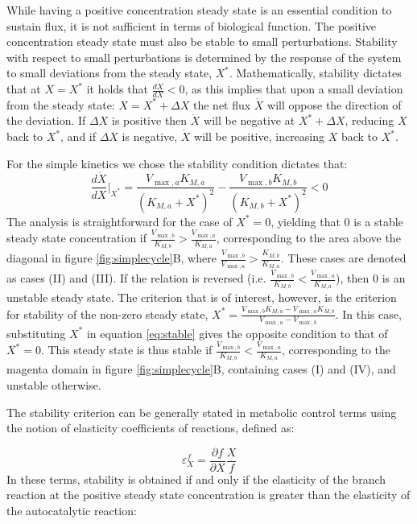     While having a positive concentration steady state is an essential condition to sustain flux, it is not sufficient in terms of biological function.
    The positive concentration steady state must also be stable to small perturbations.
    Stability with respect to small perturbations is determined by the response of the system to small deviations from the steady state, $X^*$.
    Mathematically, stability dictates that at $X=X^*$ it holds that $\frac{d\dot X}{dX} <0$, as this  implies that upon a small deviation from the steady state: $X = X^*+\Delta X$ the net flux $\dot X$ will oppose the direction of the deviation.
    If $\Delta X$ is positive then $\dot X$ will be negative at $X^*+\Delta X$, reducing $X$ back to $X^*$, and if $\Delta X$ is negative, $\dot X$ will be positive, increasing $X$ back to $X^*$.

    For the simple kinetics we chose the stability condition dictates that:
    \begin{equation}
        \label{eq:stable}
      \frac{d\dot X}{dX}\Big\vert_{X^*} = \frac{V_{\max,a}K_{M,a}}{(K_{M,a}+X^*)^2}-\frac{V_{\max,b}K_{M,b}}{(K_{M,b}+X^*)^2}<0
    \end{equation}
    The analysis is straightforward for the case of $X^*=0$, yielding that $0$ is a stable steady state concentration if $\frac{V_{\max,b}}{K_{M,b}}>\frac{V_{\max,a}}{K_{M,a}}$, corresponding to the area above the diagonal in figure \ref{fig:simplecycle}B, where $\frac{V_{\max,b}}{V_{\max,a}}>\frac{K_{M,b}}{K_{M,a}}$. These cases are denoted as cases (II) and (III).
    If the relation is reversed (i.e. $\frac{V_{\max,b}}{K_{M,b}}<\frac{V_{\max,a}}{K_{M,a}}$), then $0$ is an unstable steady state.
    The criterion that is of interest, however, is the criterion for stability of the non-zero steady state, $X^*=\frac{V_{\max,b}K_{M,a}-V_{\max,a}K_{M,b}}{V_{\max,a}-V_{\max,b}}$.
    In this case, substituting $X^*$ in equation \ref{eq:stable} gives the opposite condition to that of $X^*=0$.
    This steady state is thus stable if $\frac{V_{\max,b}}{K_{M,b}}<\frac{V_{\max,a}}{K_{M,a}}$, corresponding to the magenta domain in figure \ref{fig:simplecycle}B, containing cases (I) and (IV), and unstable otherwise.

    The stability criterion can be generally stated in metabolic control terms \cite{Fell1997-bp} using the notion of elasticity coefficients of reactions, defined as:

    \begin{equation*}
    \varepsilon^f_X=\frac{\partial f}{\partial X}\frac{X}{f}
    \end{equation*}
    In these terms, stability is obtained if and only if the elasticity of the branch reaction at the positive steady state concentration is greater than the elasticity of the autocatalytic reaction:

